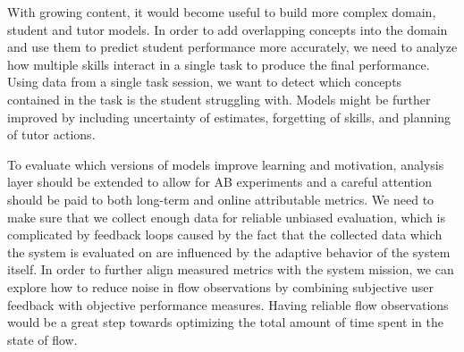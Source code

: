 With growing content, it would become useful to build more complex
domain, student and tutor models. In order to add overlapping concepts
into the domain and use them to predict student performance more accurately,
we need to analyze how multiple skills interact in a single
task to produce the final performance. %
Using data from a single task session,
we want to detect which concepts contained in the task
is the student struggling with.
Models might be further improved by including uncertainty of estimates,
forgetting of skills, and planning of tutor actions.

To evaluate which versions of models improve learning and motivation, %
analysis layer should be extended to allow for AB experiments
and a careful attention should be paid to both long-term and
online attributable metrics.
We need to make sure that we collect enough data for reliable unbiased evaluation,
which is complicated by feedback loops caused by the fact that
the collected data which the system is evaluated on are influenced by the
adaptive behavior of the system itself.
In order to further align measured metrics with the system mission,
we can explore how to reduce noise in flow observations
by combining subjective user feedback with objective performance measures.
Having reliable flow observations would be a great step towards optimizing
the total amount of time spent in the state of flow.

